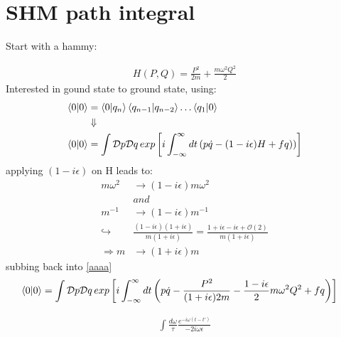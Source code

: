 \documentclass{article}
\begin{document}
\section*{SHM path integral}%
\label{sec:shm_path_integral}

Start with a hammy:

\begin{equation}
\begin{aligned}
	H \left(P,Q\right) = \frac{P^2}{2m} + \frac{m\omega^2Q^2}{2} 
\end{aligned}
\end{equation}
Interested in gound state to ground state, using:
\begin{equation}
\begin{aligned}
	\braket{0}{0} &= \braket{0}{q_n}\braket{q_{n-1}}{q_{n-2}}\ldots \braket{q_1}{0} \\
		      &\Downarrow \\
	\braket{0}{0} &= \int \mathcal{D}p \mathcal{D}q \,exp \left[i \int_{-\infty}^{\infty}dt \left(p\dot{q} - \left(1-i\epsilon)H + fq \right)\right)\right] \label{aaaa}
\end{aligned}
\end{equation}
applying $(1-i\epsilon)$ on H leads to:
\begin{equation}
\begin{aligned}
	m\omega^2 &\rightarrow (1-i\epsilon)m\omega^2 \\
		  & and \\
	m^{-1} &\rightarrow (1-i\epsilon)m^{-1} \\
	\hookrightarrow &\frac{(1-i\epsilon)(1+i\epsilon)}{m(1+i\epsilon)} = \frac{1+i\epsilon-i\epsilon+\mathcal{O}(2)}{m(1+i\epsilon)} \\
	\Rightarrow m &\rightarrow (1+i\epsilon)m
\end{aligned}
\end{equation}
subbing back into \ref{aaaa}
\begin{equation}
\begin{aligned}
	\braket{0}{0} &= \int \mathcal{D}p \mathcal{D}q \,exp \left[i \int_{-\infty}^{\infty}dt \left(p\dot{q} - \frac{P^2}{(1+i\epsilon)2m} - \frac{1-i\epsilon}{2} m\omega^2Q^2 + fq \right)\right]
\end{aligned}
\end{equation}

\begin{align}
	\int \frac{d\omega}{\tau} \frac{e^{-i\omega(t-t')}}{-2i\omega\epsilon} 
\end{align}
\end{document}
